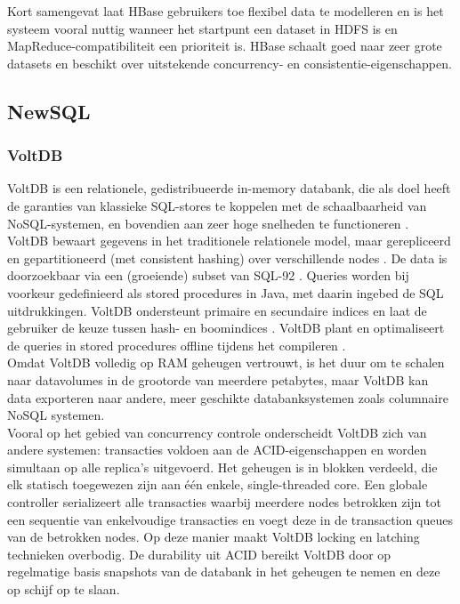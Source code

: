 Kort samengevat laat HBase gebruikers toe flexibel data te modelleren en is het systeem vooral nuttig wanneer het startpunt een dataset in HDFS is en MapReduce-compatibiliteit een prioriteit is. HBase schaalt goed naar zeer grote datasets en beschikt over uitstekende concurrency- en consistentie-eigenschappen.

\subsection{NewSQL} 

\subsubsection{VoltDB}

VoltDB is een relationele, gedistribueerde in-memory databank, die als doel heeft de garanties van klassieke SQL-stores te koppelen met de schaalbaarheid van NoSQL-systemen, en bovendien aan zeer hoge snelheden te functioneren \cite{stonebraker2013voltdb}.\\
VoltDB bewaart gegevens in het traditionele relationele model, maar gerepliceerd en gepartitioneerd (met consistent hashing) over verschillende nodes \cite{grolinger2013data}. De data is doorzoekbaar via een (groeiende) subset van SQL-92 \cite{voltdb2010voltdb}. Queries worden bij voorkeur gedefinieerd als stored procedures in Java, met daarin ingebed de SQL uitdrukkingen. VoltDB ondersteunt primaire en secundaire indices en laat de gebruiker de keuze tussen hash- en boomindices \cite{voltdb_indexes}. VoltDB plant en optimaliseert de queries in stored procedures offline tijdens het compileren \cite{voltdb_query_plans}.\\
Omdat VoltDB volledig op RAM geheugen vertrouwt, is het duur om te schalen naar datavolumes in de grootorde van meerdere petabytes, maar VoltDB kan data exporteren naar andere, meer geschikte databanksystemen zoals columnaire NoSQL systemen.\\
Vooral op het gebied van concurrency controle onderscheidt VoltDB zich van andere systemen: transacties voldoen aan de ACID-eigenschappen en worden simultaan op alle replica's uitgevoerd. Het geheugen is in blokken verdeeld, die elk statisch toegewezen zijn aan \'e\'en enkele, single-threaded core. Een globale controller serializeert alle transacties waarbij meerdere nodes betrokken zijn tot een sequentie van enkelvoudige transacties en voegt deze in de transaction queues van de betrokken nodes. Op deze manier maakt VoltDB locking en latching technieken overbodig. De durability uit ACID bereikt VoltDB door op regelmatige basis snapshots van de databank in het geheugen te nemen en deze op schijf op te slaan.\\

